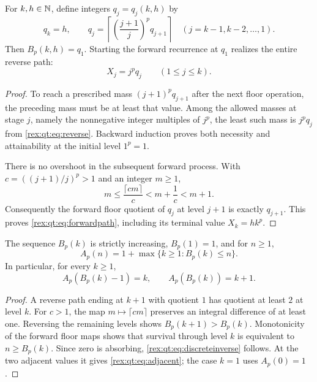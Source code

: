 \begin{proposition}\label{rex:qt:prop:reverse}
For $k,h\in\mathbb N$, define integers $q_j=q_j(k,h)$ by
\begin{equation}\label{rex:qt:eq:reverse}
 q_k=h,\qquad
 q_j=\left\lceil\left(\frac{j+1}{j}\right)^p q_{j+1}\right\rceil
          \quad(j=k-1,k-2,\ldots,1).
\end{equation}
Then $B_p(k,h)=q_1$. Starting the forward recurrence at $q_1$ realizes the entire reverse path:
\begin{equation}\label{rex:qt:eq:forwardpath}
 X_j=j^p q_j\qquad(1\le j\le k).
\end{equation}
\end{proposition}
\begin{proof}
To reach a prescribed mass $(j+1)^p q_{j+1}$ after the next floor operation, the preceding mass must be at least that value. Among the allowed masses at stage $j$, namely the nonnegative integer multiples of $j^p$, the least such mass is $j^p q_j$ from \eqref{rex:qt:eq:reverse}. Backward induction proves both necessity and attainability at the initial level $1^p=1$.

There is no overshoot in the subsequent forward process. With $c=((j+1)/j)^p>1$ and an integer $m\ge1$,
\[
 m\le\frac{\lceil cm\rceil}{c}<m+\frac1c<m+1.
\]
Consequently the forward floor quotient of $q_j$ at level $j+1$ is exactly $q_{j+1}$. This proves \eqref{rex:qt:eq:forwardpath}, including its terminal value $X_k=h k^p$.
\end{proof}

\begin{proposition}\label{rex:qt:prop:inverse}
The sequence $B_p(k)$ is strictly increasing, $B_p(1)=1$, and for $n\ge1$,
\begin{equation}\label{rex:qt:eq:discreteinverse}
 A_p(n)=1+\max\{k\ge1:B_p(k)\le n\}.
\end{equation}
In particular, for every $k\ge1$,
\begin{equation}\label{rex:qt:eq:adjacent}
 A_p(B_p(k)-1)=k,\qquad A_p(B_p(k))=k+1.
\end{equation}
\end{proposition}
\begin{proof}
A reverse path ending at $k+1$ with quotient $1$ has quotient at least $2$ at level $k$. For $c>1$, the map $m\mapsto\lceil cm\rceil$ preserves an integral difference of at least one. Reversing the remaining levels shows $B_p(k+1)>B_p(k)$. Monotonicity of the forward floor maps shows that survival through level $k$ is equivalent to $n\ge B_p(k)$. Since zero is absorbing, \eqref{rex:qt:eq:discreteinverse} follows. At the two adjacent values it gives \eqref{rex:qt:eq:adjacent}; the case $k=1$ uses $A_p(0)=1$.
\end{proof}

